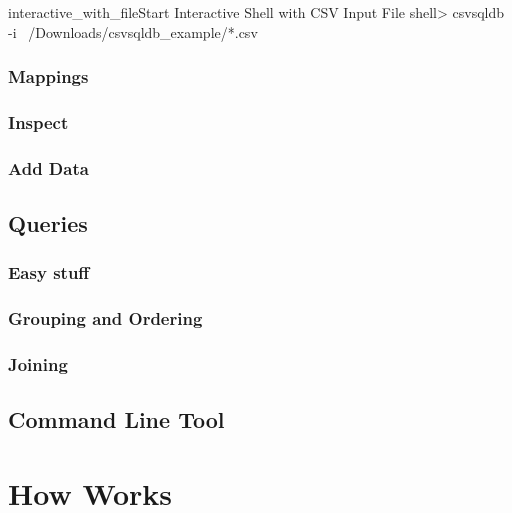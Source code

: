 \begin{ShellListing}{interactive_with_file}{Start Interactive Shell with CSV Input File}
shell> csvsqldb -i ~/Downloads/csvsqldb_example/*.csv
\end{ShellListing}

\subsubsection{Mappings}

\subsubsection{Inspect}

\subsubsection{Add Data}

\subsection{Queries}

\subsubsection{Easy stuff}

\subsubsection{Grouping and Ordering}


\subsubsection{Joining}

\subsection{Command Line Tool}

\section{How \csvsqldb{} Works}

